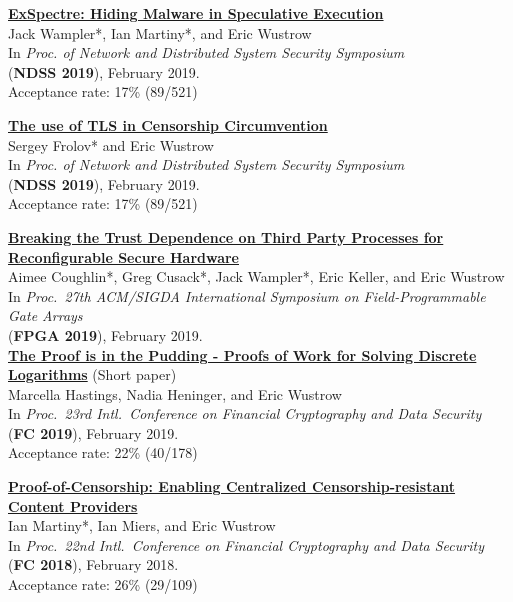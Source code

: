 \documentclass[margin,11pt]{res} %
\begin{document}
    \textbf{\href{https://www.ndss-symposium.org/wp-content/uploads/2019/02/ndss2019_02B-5_Wampler_paper.pdf}{ExSpectre: Hiding Malware in Speculative Execution}} \\
    Jack Wampler*, Ian Martiny*, and Eric Wustrow \\
    In \emph{Proc. of Network and Distributed System Security Symposium} \\
    (\textbf{NDSS 2019}), February 2019. \\
    Acceptance rate: 17\% (89/521)

    \textbf{\href{https://tlsfingerprint.io}{The use of TLS in Censorship Circumvention}} \\
    Sergey Frolov* and Eric Wustrow \\
    In \emph{Proc. of Network and Distributed System Security Symposium} \\
    (\textbf{NDSS 2019}), February 2019. \\
    Acceptance rate: 17\% (89/521)


    \textbf{\href{https://ericw.us/sdsh\_fpga2019.pdf}{Breaking the Trust Dependence on Third Party Processes for Reconfigurable Secure Hardware}} \\
    Aimee Coughlin*, Greg Cusack*, Jack Wampler*, Eric Keller, and Eric Wustrow \\
    In \emph{Proc.\ 27th ACM/SIGDA International Symposium on Field-Programmable Gate Arrays}\\
    (\textbf{FPGA 2019}), February 2019. \\

    \textbf{\href{https://eprint.iacr.org/2018/939.pdf}{The Proof is in the Pudding - Proofs of Work for Solving Discrete Logarithms}} (Short paper) \\
    Marcella Hastings, Nadia Heninger, and Eric Wustrow \\
    In \emph{Proc.\ 23rd Intl.\ Conference on Financial Cryptography and Data Security} \\
    (\textbf{FC 2019}), February 2019.\\
    Acceptance rate: 22\% (40/178)   %

    \textbf{\href{https://ericw.us/trow/proof-of-censorship.pdf}{Proof-of-Censorship: Enabling Centralized Censorship-resistant Content Providers}} \\
    Ian Martiny*, Ian Miers, and Eric Wustrow \\
    In \emph{Proc.\ 22nd Intl.\ Conference on Financial Cryptography and Data Security} \\
    (\textbf{FC 2018}), February 2018. \\
    Acceptance rate: 26\% (29/109)
\end{document}
